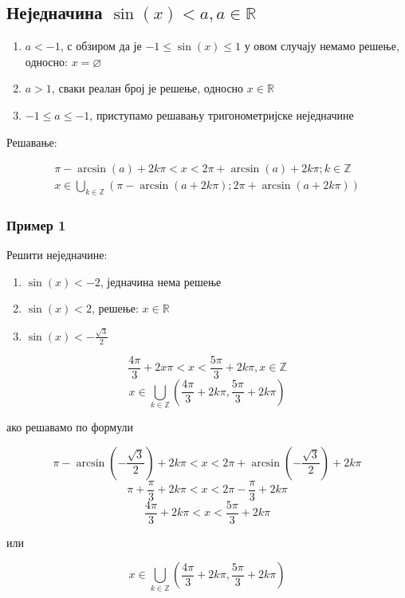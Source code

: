 \documentclass[../diplomski.tex]{subfiles}
\begin{document}
\subsection{Неједначина $\sin(x)<a,a\in\mathbb{R}$}

\begin{enumerate}[label=\alph*)]
\item $a<-1$, с обзиром да је $-1\leq\sin(x)\leq1$ у овом случају немамо решење, односно: $x=\varnothing$
\item $a>1$, сваки реалан број је решење, односно $x\in\mathbb{R}$
\item $-1\leq a\leq-1$, приступамо решавању тригонометријске неједначине
\end{enumerate}

Решавање:



\begin{equation}
\begin{split}
\pi-\arcsin(a)+2k\pi<x<2\pi+\arcsin(a)+2k\pi;k\in\mathbb{Z}\\
x\in\bigcup\limits_{k\in\mathbb{Z}}(\pi-\arcsin(a+2k\pi);2\pi+\arcsin(a+2k\pi))
\end{split}
\end{equation}


\subsubsection{Пример 1}

Решити неједначине:

\begin{enumerate}[label=\alph*)]
\item $\sin(x)<-2$, једначина нема решење
\item $\sin(x)<2$, решење: $x\in\mathbb{R}$
\item $\sin(x)<-\frac{\sqrt3}{2}$
\end{enumerate}



\[\frac{4\pi}{3}+2x\pi<x<\frac{5\pi}{3}+2k\pi,x\in\mathbb{Z}\]
\[x\in\bigcup_{k\in\mathbb{Z}}(\frac{4\pi}{3}+2k\pi,\frac{5\pi}{3}+2k\pi)\]

ако решавамо по формули

\[\pi-\arcsin\left(-\frac{\sqrt{3}}{2}\right)+2k\pi<x<2\pi+\arcsin\left(-\frac{\sqrt{3}}{2}\right)+2k\pi\]
\[\pi+\frac{\pi}{3}+2k\pi<x<2\pi-\frac{\pi}{3}+2k\pi\]
\[\frac{4\pi}{3}+2k\pi<x<\frac{5\pi}{3}+2k\pi\]
\centerline{или}
\[x\in\bigcup_{k\in\mathbb{Z}}\left(\frac{4\pi}{3}+2k\pi,\frac{5\pi}{3}+2k\pi\right)\]
\end{document}
